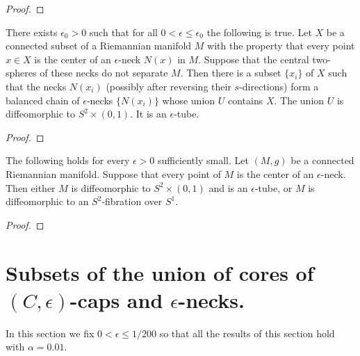 \begin{proof}
\sketch
{}
\end{proof}

\begin{proposition}
\label{prop:balanced-chain-covers-connected-set}
\label{epschains}

There exists $\epsilon_0>0$ such that for all $0<\epsilon\le
\epsilon_0$ the following is true. Let $X$ be a connected subset of
a Riemannian manifold $M$ with the property that every point $x\in
X$ is the center of an $\epsilon$-neck $N(x)$ in $M$. Suppose that
the central two-spheres of these necks do not separate $M$. Then
there is a subset $\{x_i\}$ of $X$ such that the necks $N(x_i)$
(possibly after reversing their $s$-directions) form a balanced
chain of $\epsilon$-necks $\{N(x_i)\}$ whose union $U$ contains $X$.
The union $U$ is diffeomorphic to $S^2\times (0,1)$. It is an
$\epsilon$-tube.
\end{proposition}

\begin{proof}
\sketch
{}
\end{proof}

\begin{lemma}
\label{lem:manifold-covered-by-necks-classification}
\label{S2times01}

The following holds for every $\epsilon>0$ sufficiently small. Let
$(M,g)$ be a connected Riemannian manifold. Suppose that every point
of $M$ is the center of an $\epsilon$-neck. Then either $M$ is
diffeomorphic to $S^2\times (0,1)$ and is an $\epsilon$-tube, or $M$
is diffeomorphic to an $S^2$-fibration over $S^1$.
\end{lemma}

\begin{proof}
\sketch
{}
\end{proof}


\section{Subsets of the union of cores of $(C,\epsilon)$-caps
and $\epsilon$-necks.} In this section we fix $0<\epsilon\le 1/200$
so that all the results of this section hold with $\alpha=0.01$.

